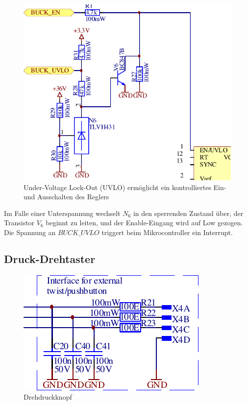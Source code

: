 \begin{figure}[th!]
    \center
    \includegraphics[width=.6\textwidth]{images/circuit/uvlo.pdf}
    \caption{Under-Voltage Lock-Out (UVLO) erm\"oglicht ein kontrolliertes Ein- und Ausschalten des Reglers}
    \label{fig:circuit:uvlo}
\end{figure}

Im Falle einer Unterspannung  wechselt  $N_6$  in den sperrenden Zustand \"uber,
der  Transistor $V_6$ beginnt zu leiten, und der  Enable-Eingang  wird  auf  Low
gezogen.  Die  Spannung  an  $BUCK\_UVLO$  triggert  beim  Mikrocontroller   ein
Interrupt.

\subsection{Druck-Drehtaster}

\begin{figure}[th!]
    \center
    \includegraphics[width=.4\textwidth]{images/circuit/pushbutton.pdf}
    \caption{Drehdruckknopf}
    \label{fig:circuit:pushbutton}
\end{figure}

